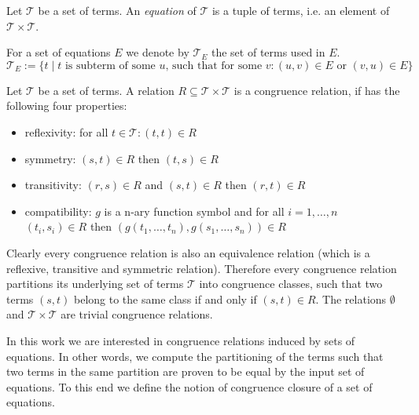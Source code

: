 \begin{definition}[Equation]

Let $\mathcal{T}$ be a set of terms.
An \emph{equation} of $\mathcal{T}$ is a tuple of terms, i.e. an element of $\mathcal{T} \times \mathcal{T}$.

\end{definition}

\noindent For a set of equations $E$ we denote by $\mathcal{T}_E$ the set of terms used in $E$.
$$\mathcal{T}_E := \{t \mid t \text{ is subterm of some } u \text{, such that for some } v: (u,v) \in E \text{ or } (v,u) \in E\}$$

\begin{definition}

Let $\mathcal{T}$ be a set of terms.
A relation $R \subseteq \mathcal{T} \times \mathcal{T}$ is a congruence relation, if has the following four properties:
\begin{itemize}
	\item reflexivity: for all $t \in \mathcal{T}: (t,t) \in R$
	\item symmetry: $(s,t) \in R$ then $(t,s) \in R$
	\item transitivity: $(r,s) \in R$ and $(s,t) \in R$ then $(r,t) \in R$
	\item compatibility: $g$ is a n-ary function symbol and for all $i = 1,\ldots,n$ $(t_i,s_i) \in R$ then $(g(t_1,\ldots,t_n),g(s_1,\ldots,s_n)) \in R$
\end{itemize}

\end{definition}

Clearly every congruence relation is also an equivalence relation (which is a reflexive, transitive and symmetric relation).
Therefore every congruence relation partitions its underlying set of terms $\mathcal{T}$ into congruence classes, such that two terms $(s,t)$ belong to the same class if and only if $(s,t) \in R$.
The relations $\emptyset$ and $\mathcal{T} \times \mathcal{T}$ are trivial congruence relations.

In this work we are interested in congruence relations induced by sets of equations.
In other words, we compute the partitioning of the terms such that two terms in the same partition are proven to be equal by the input set of equations.
To this end we define the notion of congruence closure of a set of equations.

